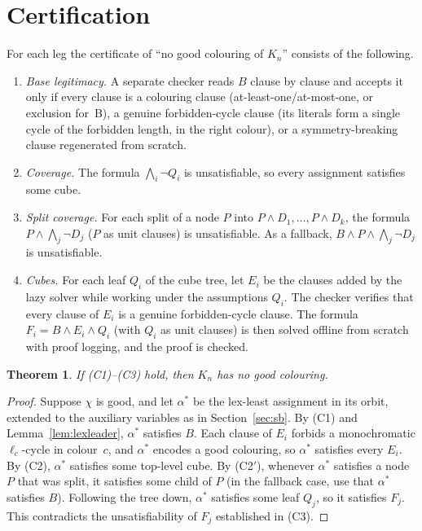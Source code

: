 \documentclass[11pt]{amsart}
\newtheorem{theorem}{Theorem}
\theoremstyle{definition}
\theoremstyle{remark}
\begin{document}
\section{Certification}\label{sec:cert}

For each leg the certificate of ``no good colouring of $K_n$'' consists of the following.
\begin{enumerate}
\item[(C1)] \emph{Base legitimacy.} A separate checker reads $B$ clause by clause and accepts it only if every clause is a colouring
clause (at-least-one/at-most-one, or exclusion for~B), a genuine forbidden-cycle clause (its literals form a single cycle of the
forbidden length, in the right colour), or a symmetry-breaking clause regenerated from scratch.
\item[(C2)] \emph{Coverage.} The formula $\bigwedge_i\neg Q_i$ is unsatisfiable, so every assignment satisfies some cube.
\item[(C2$'$)] \emph{Split coverage.} For each split of a node $P$ into $P\wedge D_1,\dots,P\wedge D_k$, the formula
$P\wedge\bigwedge_j\neg D_j$ ($P$ as unit clauses) is unsatisfiable. As a fallback, $B\wedge P\wedge\bigwedge_j\neg D_j$ is unsatisfiable.
\item[(C3)] \emph{Cubes.} For each leaf $Q_i$ of the cube tree, let $E_i$ be the clauses added by the lazy solver while working under the assumptions $Q_i$.
The checker verifies that every clause of $E_i$ is a genuine forbidden-cycle clause. The formula $F_i=B\wedge E_i\wedge Q_i$ (with $Q_i$
as unit clauses) is then solved offline from scratch with proof logging, and the proof is checked.
\end{enumerate}

\begin{theorem}\label{thm:cert}
If (C1)--(C3) hold, then $K_n$ has no good colouring.
\end{theorem}
\begin{proof}
Suppose $\chi$ is good, and let $\alpha^*$ be the lex-least assignment in its orbit, extended to the auxiliary variables as in
Section~\ref{sec:sb}. By (C1) and Lemma~\ref{lem:lexleader}, $\alpha^*$ satisfies $B$. Each clause of $E_i$ forbids a monochromatic
$\ell_c$-cycle in colour~$c$, and $\alpha^*$ encodes a good colouring, so $\alpha^*$ satisfies every $E_i$. By (C2), $\alpha^*$
satisfies some top-level cube. By (C2$'$), whenever $\alpha^*$ satisfies a node $P$ that was split, it satisfies some child of $P$ (in the
fallback case, use that $\alpha^*$ satisfies $B$). Following the tree down, $\alpha^*$ satisfies some leaf $Q_j$, so it satisfies $F_j$. This contradicts the unsatisfiability of $F_j$ established in (C3).
\end{proof}
\end{document}
